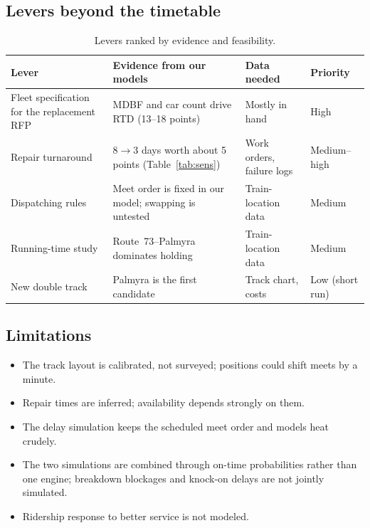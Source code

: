 \documentclass[11pt]{article}
\begin{document}
\subsection{Levers beyond the timetable}
\begin{table}[ht]\centering\small
\begin{tabularx}{\textwidth}{@{}p{3.3cm}LLp{2cm}@{}}
\toprule
Lever & Evidence from our models & Data needed & Priority \\ \midrule
Fleet specification for the replacement RFP & MDBF and car count drive RTD (13--18 points) & Mostly in hand & High \\
Repair turnaround & 8$\to$3 days worth about 5 points (Table~\ref{tab:sens}) & Work orders, failure logs & Medium--high \\
Dispatching rules & Meet order is fixed in our model; swapping is untested & Train-location data & Medium \\
Running-time study & Route~73--Palmyra dominates holding & Train-location data & Medium \\
New double track & Palmyra is the first candidate & Track chart, costs & Low (short run) \\
\bottomrule
\end{tabularx}
\caption{Levers ranked by evidence and feasibility.}\label{tab:levers}
\end{table}

\subsection{Limitations}
\begin{itemize}
\item The track layout is calibrated, not surveyed; positions could shift meets by a minute.
\item Repair times are inferred; availability depends strongly on them.
\item The delay simulation keeps the scheduled meet order and models heat crudely.
\item The two simulations are combined through on-time probabilities rather than one engine; breakdown blockages and knock-on delays are not jointly simulated.
\item Ridership response to better service is not modeled.
\end{itemize}

\end{document}
